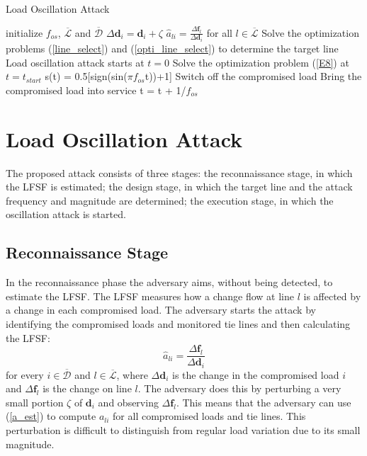 \documentclass[journal]{IEEEtran}
\begin{document}
\begin{algorithm}[!t]
\caption{Load Oscillation Attack}
\begin{algorithmic}[1]
\State initialize $f_{os}$, $\mathcal{\overline{L}}$ and $\mathcal{\overline{D}}$
\State $ \Delta \mathbf{d}_i =  \mathbf{d}_i + \zeta$
\State $\hat{a}_{li} =  \frac{\Delta \mathbf{f}_l}{\Delta \mathbf{d}_i}  $ for all $l\in \mathcal{\overline{L}}$
\EndFor
\State Solve the optimization problems (\ref{line_select}) and (\ref{opti_line_select}) to determine the target line   
\State Load oscillation attack starts at $t = 0$
\State Solve the optimization problem (\ref{E8}) at $t = t_{start}$
\State s(t) = 0.5[sign(sin($\pi f_{os} $t))+1]
\State Switch off the compromised load
\State Bring the compromised load into service
\EndIf
\EndIf
\State t = t + 1/$f_{os}$
\EndWhile
\end{algorithmic}
\end{algorithm} 




\section{Load Oscillation Attack} 

The proposed attack consists of three stages: the reconnaissance stage, in which the LFSF is estimated; the design stage, in which the target line and the attack frequency and magnitude are determined; the execution stage, in which the oscillation attack is started.



\subsection{Reconnaissance Stage}
In the reconnaissance phase the adversary aims, without being detected, to estimate the LFSF. The LFSF measures how a change flow at line $l$ is affected by a change in each compromised load. The adversary starts the attack by identifying the compromised loads and monitored tie lines and then calculating the LFSF: 
\begin{equation}
\label{a_est}
\hat{a}_{li} =  \frac{\Delta \mathbf{f}_l}{\Delta \mathbf{d}_i} 
\end{equation}
for every $i\in \mathcal{\overline{D}}$ and $l\in \mathcal{\overline{L}} $, where %
$ \Delta \mathbf{d}_i$ is the change in the compromised load $i$ and $\Delta \mathbf{f}_l$ is the change on line $l$. The adversary does this by perturbing a very small portion $\zeta$ of $ \mathbf{d}_i$ and observing $ \Delta \mathbf{f}_l$. This means that the adversary can use (\ref{a_est}) to compute $ a_{li}$ for all compromised loads and tie lines. This perturbation is difficult to distinguish from regular load variation due to its small magnitude. 
\end{document}
